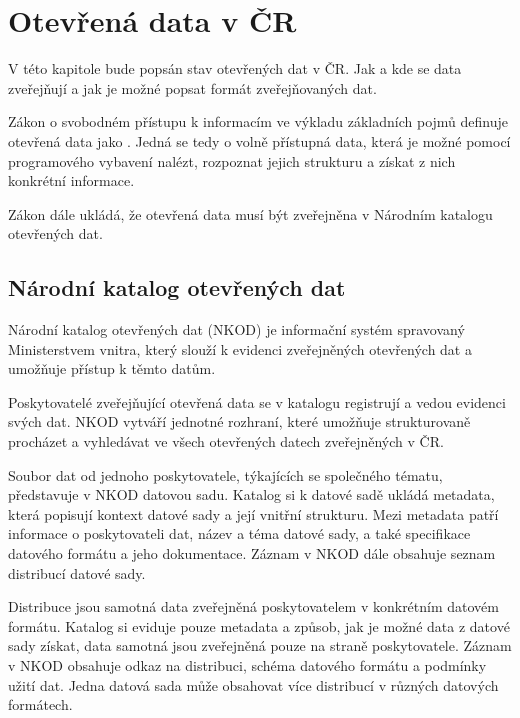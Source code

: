 
\chapter{Otevřená data v ČR}\label{kap:opendata}

V této kapitole bude popsán stav otevřených dat v ČR. Jak a kde se data zveřejňují a jak je možné popsat formát zveřejňovaných dat.

Zákon o svobodném přístupu k informacím ve výkladu základních pojmů \cite{ZakonSvobodny3} definuje otevřená data jako . Jedná se tedy o volně přístupná data, která je možné pomocí programového vybavení nalézt, rozpoznat jejich strukturu a získat z nich konkrétní informace. 

Zákon dále ukládá, že otevřená data musí být zveřejněna v Národním katalogu otevřených dat.

\section{Národní katalog otevřených dat}\label{sec:nkod}

Národní katalog otevřených dat (NKOD) \cite{NKOD} je informační systém spravovaný Ministerstvem vnitra, který slouží k evidenci zveřejněných otevřených dat a umožňuje přístup k těmto datům. 

Poskytovatelé zveřejňující otevřená data se v katalogu registrují a vedou evidenci svých dat. NKOD vytváří jednotné rozhraní, které umožňuje strukturovaně procházet a vyhledávat ve všech otevřených datech zveřejněných v ČR.

Soubor dat od jednoho poskytovatele, týkajících se společného tématu, představuje v NKOD datovou sadu. Katalog si k datové sadě ukládá metadata, která popisují kontext datové sady a její vnitřní strukturu. Mezi metadata patří informace o poskytovateli dat, název a téma datové sady, a také specifikace datového formátu a jeho dokumentace. Záznam v NKOD dále obsahuje seznam distribucí datové sady. 

Distribuce jsou samotná data zveřejněná poskytovatelem v konkrétním datovém formátu. Katalog si eviduje pouze metadata a způsob, jak je možné data z datové sady získat, data samotná jsou zveřejněná pouze na straně poskytovatele. Záznam v NKOD obsahuje odkaz na distribuci, schéma datového formátu a podmínky užití dat. Jedna datová sada může obsahovat více distribucí v různých datových formátech.

